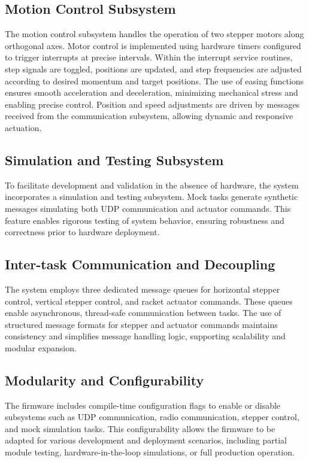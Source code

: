 \subsection{Motion Control Subsystem}
The motion control subsystem handles the operation of two stepper motors along orthogonal axes. Motor control is implemented using hardware timers configured to trigger interrupts at precise intervals. Within the interrupt service routines, step signals are toggled, positions are updated, and step frequencies are adjusted according to desired momentum and target positions. The use of easing functions ensures smooth acceleration and deceleration, minimizing mechanical stress and enabling precise control. Position and speed adjustments are driven by messages received from the communication subsystem, allowing dynamic and responsive actuation.

\subsection{Simulation and Testing Subsystem}
To facilitate development and validation in the absence of hardware, the system incorporates a simulation and testing subsystem. Mock tasks generate synthetic messages simulating both UDP communication and actuator commands. This feature enables rigorous testing of system behavior, ensuring robustness and correctness prior to hardware deployment.

\subsection{Inter-task Communication and Decoupling}
The system employs three dedicated message queues for horizontal stepper control, vertical stepper control, and racket actuator commands. These queues enable asynchronous, thread-safe communication between tasks. The use of structured message formats for stepper and actuator commands maintains consistency and simplifies message handling logic, supporting scalability and modular expansion.

\subsection{Modularity and Configurability}
The firmware includes compile-time configuration flags to enable or disable subsystems such as UDP communication, radio communication, stepper control, and mock simulation tasks. This configurability allows the firmware to be adapted for various development and deployment scenarios, including partial module testing, hardware-in-the-loop simulations, or full production operation.

